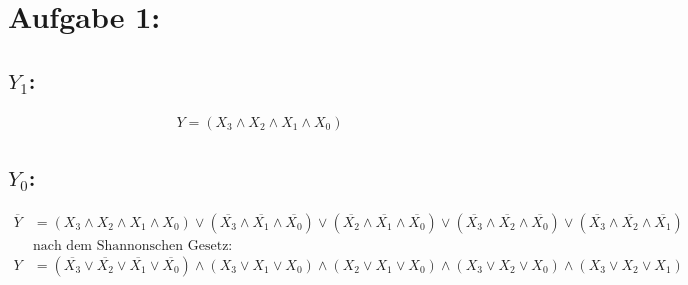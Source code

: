 \documentclass[]{article}
\newcommand{\V}{\lor}
\newcommand{\A}{\land}
\newcommand{\T}[1]{\overline{#1}}
\begin{document}

\section*{Aufgabe 1:}
\subsection*{$Y_1$:}
	\begin{align*}
		Y = (X_3 \A X_2 \A X_1 \A X_0)
	\end{align*}
\subsection*{$Y_0$:}
	\begin{align*}
		\T{Y} &= (X_3 \A X_2 \A X_1 \A X_0) \V (\T{X_3} \A \T{X_1} \A \T{X_0}) \V (\T{X_2} \A \T{X_1} \A \T{X_0}) \V (\T{X_3} \A \T{X_2} \A \T{X_0}) \V (\T{X_3} \A \T{X_2} \A \T{X_1})\\
		&\text{nach dem Shannonschen Gesetz:}\\
		Y &= (\T{X_3} \V \T{X_2} \V \T{X_1} \V \T{X_0}) \A (X_3 \V X_1 \V X_0) \A (X_2 \V X_1 \V X_0) \A (X_3 \V X_2 \V X_0) \A (X_3 \V X_2 \V X_1)
	\end{align*}
\end{document}
